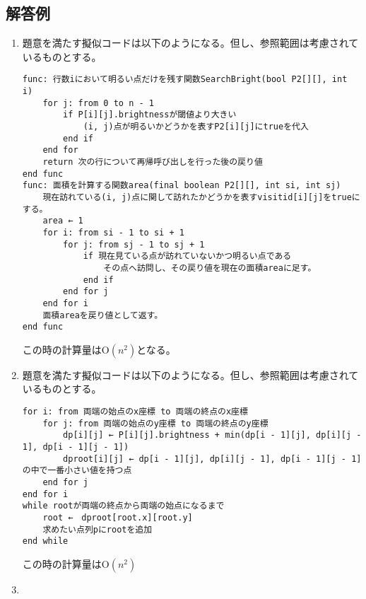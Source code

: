 \newpage

\subsection{解答例}
\begin{enumerate}[(1)]
    \item 題意を満たす擬似コードは以下のようになる。但し、参照範囲は考慮されているものとする。
\begin{lstlisting}[frame = sigle, style = customText]
func: 行数iにおいて明るい点だけを残す関数SearchBright(bool P2[][], int i)
    for j: from 0 to n - 1
        if P[i][j].brightnessが閾値より大きい
            (i, j)点が明るいかどうかを表すP2[i][j]にtrueを代入
        end if
    end for
    return 次の行について再帰呼び出しを行った後の戻り値
end func
func: 面積を計算する関数area(final boolean P2[][], int si, int sj) 
    現在訪れている(i, j)点に関して訪れたかどうかを表すvisitid[i][j]をtrueにする。
    area ← 1
    for i: from si - 1 to si + 1
        for j: from sj - 1 to sj + 1
            if 現在見ている点が訪れていないかつ明るい点である
                その点へ訪問し、その戻り値を現在の面積areaに足す。
            end if
        end for j
    end for i
    面積areaを戻り値として返す。
end func
\end{lstlisting}
    この時の計算量は$\mathrm{O}(n^2)$となる。
    \item 題意を満たす擬似コードは以下のようになる。但し、参照範囲は考慮されているものとする。
\begin{lstlisting}[frame = single, style = customText]
for i: from 両端の始点のx座標 to 両端の終点のx座標
    for j: from 両端の始点のy座標 to 両端の終点のy座標
        dp[i][j] ← P[i][j].brightness + min(dp[i - 1][j], dp[i][j - 1], dp[i - 1][j - 1])
        dproot[i][j] ← dp[i - 1][j], dp[i][j - 1], dp[i - 1][j - 1]の中で一番小さい値を持つ点
    end for j
end for i
while rootが両端の終点から両端の始点になるまで
    root ←　dproot[root.x][root.y]
    求めたい点列pにrootを追加
end while
\end{lstlisting}
    この時の計算量は$\mathrm{O}(n^2)$
    \item 
\end{enumerate}